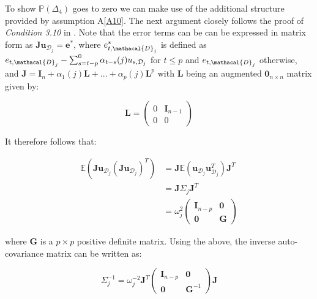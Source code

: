 \documentclass[11pt]{report}\usepackage[utf8]{inputenc}
\begin{document}
To show $\mathbb{P}\left ( \Delta_4 \right )$ goes to zero we can make use of the additional structure provided by assumption A\ref{A10}. The next argument closely follows the proof of \textit{Condition 3.10} in \cite{wickens1969consistency}. Note that the error terms can be can be expressed in matrix form as $\boldsymbol{Ju}_{\mathcal{D}_j} = \boldsymbol{e}^*$, where $e_{t,\mathacal{D}_j}^*$ is defined as $e_{t,\mathacal{D}_j} - \sum_{s=t-p}^{0} \alpha_{t-s}(j) u_{s,\mathcal{D}_j}$ for $t \leq p$ and $e_{t,\mathacal{D}_j}$ otherwise, and $\boldsymbol{J} = \boldsymbol{I}_n + \alpha_1(j)\boldsymbol{L} + ...+ \alpha_p(j)\boldsymbol{L}^p$  with $\boldsymbol{L}$ being an augmented $\boldsymbol{0}_{n \times n}$ matrix given by:

\begin{equation*}
    \boldsymbol{L} = \begin{pmatrix}
    0 & \boldsymbol{I}_{n-1}\\ 
    0 & 0
    \end{pmatrix}
\end{equation*}

It therefore follows that: 

\begin{align*}
    \mathbb{E}\left ( \boldsymbol{Ju}_{\mathcal{D}_j}\left ( \boldsymbol{Ju}_{\mathcal{D}_j} \right )^T \right ) & = \boldsymbol{J}\mathbb{E}\left ( \boldsymbol{u}_{\mathcal{D}_j}\boldsymbol{u}_{\mathcal{D}_j}^T \right ) \boldsymbol{J}^T \\ 
    & = \boldsymbol{J} \Sigma_j \boldsymbol{J}^T\\ 
    & = \omega_j^2 \begin{pmatrix}
    \boldsymbol{I}_{n-p} & \boldsymbol{0} \\ 
    \boldsymbol{0} & \boldsymbol{G}
    \end{pmatrix}
\end{align*}

where $\boldsymbol{G}$ is a $p \times p$ positive definite matrix. Using the above, the inverse auto-covariance matrix can be written as: 

\begin{equation*}
    \Sigma_j^{-1} = \omega_j^{-2} \boldsymbol{J}^T \begin{pmatrix}
    \boldsymbol{I}_{n-p} & \boldsymbol{0} \\ 
    \boldsymbol{0} & \boldsymbol{G}^{-1}
    \end{pmatrix} \boldsymbol{J}
\end{equation*}
    
\end{document}
